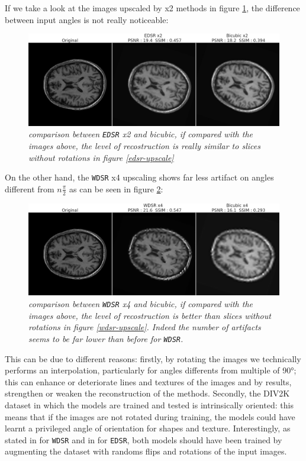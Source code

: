 \documentclass[12pt,a4paper]{report}
\begin{document}
If we take a look at the images upscaled by x2 methods in figure \ref{fig:edsr-angle-18}, the difference between input angles is not really noticeable: 

\begin{figure}[H]
 \centering
 \includegraphics[scale=0.3]{./images/edsr_angle_18.png}
 \caption{\it comparison between {\tt EDSR} x2 and bicubic, if compared with the images above, the level of recostruction is really similar to slices without rotations in figure \ref{edsr-upscale}}
 \label{fig:edsr-angle-18}
\end{figure}

On the other hand, the {\tt WDSR} x4 upscaling shows far less artifact on angles different from $n\frac{\pi}{2}$ as can be seen in figure \ref{fig:wdsr-angle-18}:

\begin{figure}[H]
 \centering
 \includegraphics[scale=0.3]{./images/wdsr_angle_18.png}
 \caption{\it comparison between {\tt WDSR} x4 and bicubic, if compared with the images above, the level of recostruction is better than slices without rotations in figure \ref{wdsr-upscale}. Indeed the number of artifacts seems to be far lower than before for {\tt WDSR}.}
 \label{fig:wdsr-angle-18}
\end{figure}

This can be due to different reasons: firstly, by rotating the images we technically performs an interpolation, particularly for angles differents from multiple of 90°; this can enhance or deteriorate lines and textures of the images and by results, strengthen or weaken the reconstruction of the methods. 
Secondly, the DIV2K dataset in which the models are trained and tested is intrinsically oriented: this means that if the images are not rotated during training, the models could have learnt a privileged angle of orientation for shapes and texture.
Interestingly, as stated in \cite{wdsr} for {\tt WDSR} and in \cite{edsr} for {\tt EDSR}, both models should have been trained by augmenting the dataset with randoms flips and rotations of the input images. 
\end{document}
